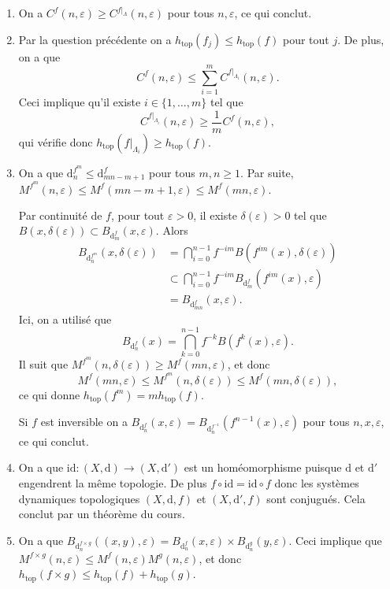 \documentclass[a4paper,12pt,openany]{article}
\theoremstyle{plain}
\theoremstyle{definition}
\newcommand{\dd}{\mathrm{d}}
\newcommand{\id}{\mathrm{id}}
\newcommand{\htop}{h_\mathrm{top}}
\begin{document}
\begin{enumerate}
\item On a $C^f(n, \varepsilon) \geqslant C^{f|_\Lambda}(n, \varepsilon)$ pour tous $n, \varepsilon$, ce qui conclut.
\item Par la question pr\'ec\'edente on a $\htop(f_j) \leqslant \htop(f)$ pour tout $j$. De plus, on a que
$$
C^f(n, \varepsilon) \leqslant \sum_{i=1}^m C^{f|_{\Lambda_i}}(n, \varepsilon).
$$
Ceci implique qu'il existe $i \in \{1, \dots, m\}$ tel que 
$$C^{f|_{\Lambda_i}}(n, \varepsilon) \geqslant \frac{1}{m}C^f(n, \varepsilon),$$
qui v\'erifie donc $\htop(f|_{\Lambda_i}) \geqslant \htop(f)$.
\item On a que $\dd^{f^m}_n \leqslant \dd^{f}_{mn-m+1}$ pour tous $m,n \geqslant 1$. Par suite, $M^{f^m}(n, \varepsilon) \leqslant M^{f}(mn -m + 1, \varepsilon) \leqslant M^f(mn, \varepsilon).$ 

Par continuit\'e de $f$, pour tout $\varepsilon > 0$, il existe $\delta(\varepsilon) > 0$ tel que $B(x, \delta(\varepsilon)) \subset B_{\dd^f_m}(x, \varepsilon).$ Alors 
$$
\begin{aligned}
B_{\dd^{f^m}_n}(x, \delta(\varepsilon)) &= \bigcap_{i=0}^{n-1} f^{-im} B(f^{im}(x), \delta(\varepsilon)) \\
&\subset \bigcap_{i=0}^{n-1} f^{-im} B_{\dd^f_m}(f^{im}(x), \varepsilon) \\
&= B_{\dd^{f}_{mn}}(x, \varepsilon).
\end{aligned}
$$
Ici, on a utilis\'e que
$$
B_{\dd^f_n}(x) = \bigcap_{k=0}^{n-1} f^{-k}B(f^k(x), \varepsilon).
$$
Il suit que $M^{f^m}(n, \delta(\varepsilon)) \geqslant M^{f}(mn, \varepsilon)$, et donc 
$$
M^{f}(mn, \varepsilon) \leqslant M^{f^m}(n, \delta(\varepsilon)) \leqslant M^f(mn, \delta(\varepsilon)),
$$
ce qui donne $\htop(f^m) = m\htop(f)$. 

Si $f$ est inversible on a $B_{\dd^f_n}(x, \varepsilon) = B_{\dd^{f^{-1}}_n}(f^{n-1}(x), \varepsilon)$ pour tous $n, x, \varepsilon$, ce qui conclut.

\item On a que $\id : (X, \dd) \to (X, \dd')$ est un hom\'eomorphisme puisque $\dd$ et $\dd'$ engendrent la m\^eme topologie. De plus $f \circ \id = \id \circ f$ donc les syst\`emes dynamiques topologiques $(X, \dd, f)$ et $(X, \dd', f)$ sont conjugu\'es. Cela conclut par un th\'eor\`eme du cours.


\item On a que
$
B_{\dd^{f\times g}_n}((x,y), \varepsilon) = B_{\dd^f_n}(x, \varepsilon) \times B_{\dd^g_n}(y, \varepsilon).
$
Ceci implique que $M^{f \times g}(n, \varepsilon) \leqslant M^f(n, \varepsilon) M^g(n, \varepsilon)$, et donc $\htop(f\times g) \leqslant \htop(f) + \htop(g)$.


\end{enumerate}
\end{document}

